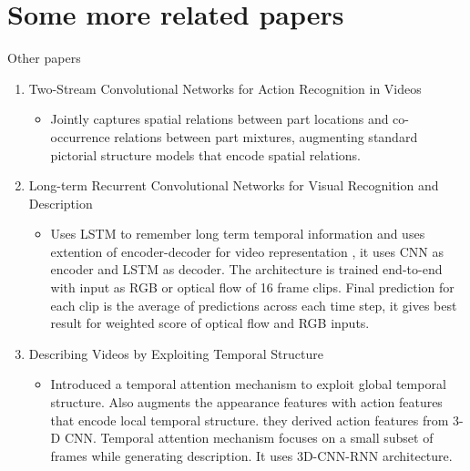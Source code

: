 \documentclass[pdf]{beamer}
\begin{document}
    \section{Some more related papers}
    \begin{frame}[allowframebreaks]{Other papers}
    \begin{enumerate}
        \item Two-Stream Convolutional Networks for Action Recognition in Videos \cite{2-stream-cnn}
        \begin{itemize}
            \item Jointly captures spatial relations between part locations and co-occurrence relations between part mixtures, augmenting standard pictorial structure models that encode spatial relations.

        \end{itemize}
        \item Long-term Recurrent Convolutional Networks for Visual Recognition and Description \cite{long-term-rnn}
        \begin{itemize}
            \item Uses LSTM to remember long term temporal information and uses extention of encoder-decoder for video representation , it uses CNN as encoder and LSTM as decoder. The architecture is trained end-to-end with input as RGB or optical flow of 16 frame clips. Final prediction for each clip is the average of predictions across each time step, it gives best result for weighted score of optical flow and RGB inputs.

        \end{itemize}
        
        
        \item Describing Videos by Exploiting Temporal Structure \cite{describe-video}
        
        \begin{itemize}
            \item Introduced a temporal attention mechanism to exploit global temporal structure. Also augments the appearance features with action features that encode local temporal structure. they derived action features from 3-D CNN. Temporal attention mechanism focuses on a small subset of frames while generating description. It uses 3D-CNN-RNN architecture.

        \end{itemize}
     

\end{enumerate}
\end{frame}
\end{document}
